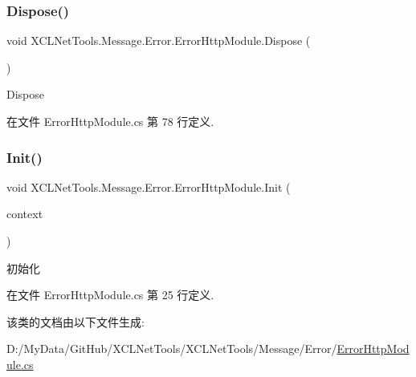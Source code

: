 \subsubsection{\texorpdfstring{Dispose()}{Dispose()}}
{\footnotesize\ttfamily void X\+C\+L\+Net\+Tools.\+Message.\+Error.\+Error\+Http\+Module.\+Dispose (\begin{DoxyParamCaption}{ }\end{DoxyParamCaption})}



Dispose 



在文件 Error\+Http\+Module.\+cs 第 78 行定义.

\mbox{\label{class_x_c_l_net_tools_1_1_message_1_1_error_1_1_error_http_module_aa4e06d53382795826ed453b62afa265d}} 
\subsubsection{\texorpdfstring{Init()}{Init()}}
{\footnotesize\ttfamily void X\+C\+L\+Net\+Tools.\+Message.\+Error.\+Error\+Http\+Module.\+Init (\begin{DoxyParamCaption}\item[{Http\+Application}]{context }\end{DoxyParamCaption})}



初始化 



在文件 Error\+Http\+Module.\+cs 第 25 行定义.



该类的文档由以下文件生成\+:\begin{DoxyCompactItemize}
\item 
D\+:/\+My\+Data/\+Git\+Hub/\+X\+C\+L\+Net\+Tools/\+X\+C\+L\+Net\+Tools/\+Message/\+Error/\hyperlink{_error_http_module_8cs}{Error\+Http\+Module.\+cs}\end{DoxyCompactItemize}
